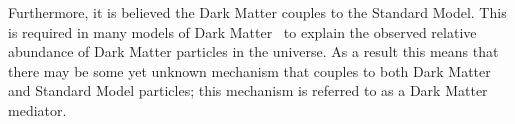 %

Furthermore, it is believed the Dark Matter couples to the Standard Model.
This is required in many models of Dark Matter~\cite{theo-bsm_dm_feng} to explain the
observed relative abundance of Dark Matter particles in the universe.
As a result this means that there may be some yet unknown mechanism that couples to both Dark Matter and
Standard Model particles; this mechanism is referred to as a Dark Matter mediator.

